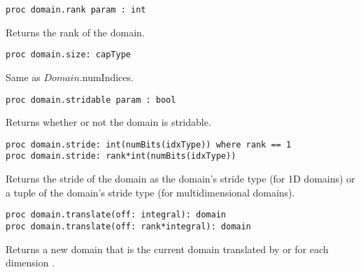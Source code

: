 \begin{protohead}
\begin{verbatim}
proc domain.rank param : int
\end{verbatim}
\end{protohead}
\begin{protobody}
Returns the rank of the domain.
\end{protobody}

\begin{protohead}
\begin{verbatim}
proc domain.size: capType
\end{verbatim}
\end{protohead}
\begin{protobody}
Same as $Domain$.numIndices.
\end{protobody}

\begin{protohead}
\begin{verbatim}
proc domain.stridable param : bool
\end{verbatim}
\end{protohead}
\begin{protobody}
Returns whether or not the domain is stridable.
\end{protobody}

\begin{protohead}
\begin{verbatim}
proc domain.stride: int(numBits(idxType)) where rank == 1
proc domain.stride: rank*int(numBits(idxType))
\end{verbatim}
\end{protohead}
\begin{protobody}
Returns the stride of the domain as the domain's stride type (for 1D
domains) or a tuple of the domain's stride type (for multidimensional
domains).
\end{protobody}

\begin{protohead}
\begin{verbatim}
proc domain.translate(off: integral): domain
proc domain.translate(off: rank*integral): domain
\end{verbatim}
\end{protohead}
\begin{protobody}
Returns a new domain that is the current domain translated
by  or  for each dimension .
\end{protobody}

